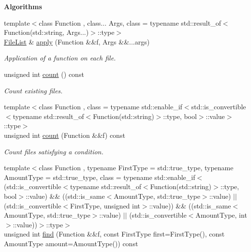 \begin{Indent}{\bf Algorithms}\par
\begin{DoxyCompactItemize}
\item 
{\footnotesize template$<$class Function , class... Args, class  = typename std\-::result\-\_\-of$<$\-Function(std\-::string, Args...)$>$\-::type$>$ }\\\hyperlink{exceptionmagrathea_1_1FileList}{File\-List} \& \hyperlink{exceptionmagrathea_1_1FileList_a234293368eca6af440e8eac6c12e0b05}{apply} (Function \&\&f, Args \&\&...args)
\begin{DoxyCompactList}\small\item\em Application of a function on each file. \end{DoxyCompactList}\item 
unsigned int \hyperlink{exceptionmagrathea_1_1FileList_acc2fab8065e767ba21efdc94d9f9746e}{count} () const 
\begin{DoxyCompactList}\small\item\em Count existing files. \end{DoxyCompactList}\item 
{\footnotesize template$<$class Function , class  = typename std\-::enable\-\_\-if$<$std\-::is\-\_\-convertible$<$typename std\-::result\-\_\-of$<$\-Function(std\-::string)$>$\-::type, bool$>$\-::value$>$\-::type$>$ }\\unsigned int \hyperlink{exceptionmagrathea_1_1FileList_a6e3447e6a2a10d116d3a04be506cf506}{count} (Function \&\&f) const 
\begin{DoxyCompactList}\small\item\em Count files satisfying a condition. \end{DoxyCompactList}\item 
{\footnotesize template$<$class Function , typename First\-Type  = std\-::true\-\_\-type, typename Amount\-Type  = std\-::true\-\_\-type, class  = typename std\-::enable\-\_\-if$<$(std\-::is\-\_\-convertible$<$typename std\-::result\-\_\-of$<$\-Function(std\-::string)$>$\-::type, bool$>$\-::value) \&\& ((std\-::is\-\_\-same$<$\-Amount\-Type, std\-::true\-\_\-type$>$\-::value) $|$$|$ (std\-::is\-\_\-convertible$<$\-First\-Type, unsigned int$>$\-::value)) \&\& ((std\-::is\-\_\-same$<$\-Amount\-Type, std\-::true\-\_\-type$>$\-::value) $|$$|$ (std\-::is\-\_\-convertible$<$\-Amount\-Type, int$>$\-::value))$>$\-::type$>$ }\\unsigned int \hyperlink{exceptionmagrathea_1_1FileList_af9dc78ac2cdb9fb8fd7274f22a657d31}{find} (Function \&\&f, const First\-Type first=First\-Type(), const Amount\-Type amount=Amount\-Type()) const 

\end{DoxyCompactItemize}
\end{Indent}
